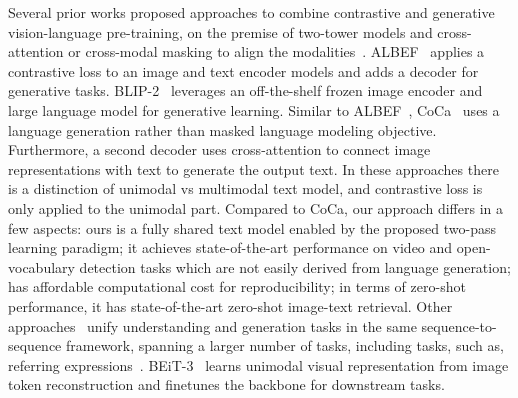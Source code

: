 \documentclass[10pt]{article} \usepackage[accepted]{tmlr}
\begin{document}
Several prior works proposed approaches to combine contrastive and generative vision-language pre-training, on the premise of two-tower models and cross-attention or cross-modal masking to align the modalities~\citep{albef,singh2022flava,li2022blip,Li2023BLIP2BL,yu2022coca}. ALBEF~\citep{albef} applies a contrastive loss to an image and text encoder models and adds a decoder for generative tasks. BLIP-2~\citep{Li2023BLIP2BL} leverages an off-the-shelf frozen image encoder and large language model for generative learning. Similar to ALBEF~\citep{albef}, CoCa~\citep{yu2022coca} uses a language generation rather than masked language modeling objective. Furthermore, a second decoder uses cross-attention to connect image representations with text to generate the output text. In these approaches there is a distinction of unimodal vs multimodal text model, and contrastive loss is only applied to the unimodal part. Compared to CoCa, our approach differs in a few aspects: ours is a fully shared text model enabled by the proposed two-pass learning paradigm; it achieves state-of-the-art performance on video and open-vocabulary detection tasks which are not easily derived from language generation; has affordable computational cost for reproducibility; in terms of zero-shot performance, it has state-of-the-art zero-shot image-text retrieval. Other approaches~\citep{wang2022unifying,UnifiedIO} unify understanding and generation tasks in the same sequence-to-sequence framework, spanning a larger number of tasks, including tasks, such as, referring expressions~\citep{refcoco}. BEiT-3~\citep{bao2021beit} learns unimodal visual representation from image token reconstruction and finetunes the backbone for downstream tasks.
\end{document}
